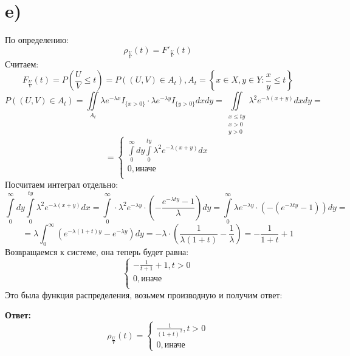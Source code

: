 \documentclass[a4paper,12pt]{article}
\begin{document}
\section*{e)}
По определению:
\[
\rho_{\frac{U}{V}}(t) = F'_{\frac{U}{V}}(t)
\]
Считаем:
\[
F_{\frac{U}{V}} (t) = P\left(\frac{U}{V} \leq t\right) = P((U, V) \in A_t), A_t = \left\{ x \in X, y \in Y : \frac{x}{y} \leq t \right\}
\]
\[
P((U, V) \in A_t) = \iint\limits_{A_t} \lambda e^{- \lambda x} I_{\{x > 0\}} \cdot \lambda e^{- \lambda y} I_{\{y > 0\}} dxdy = \iint\limits_{\begin{matrix}
x \leq ty \\
x > 0 \\
y > 0
\end{matrix}} \lambda^2 e^{-\lambda(x+y)} dx dy =
\]
\[
=
 \begin{cases}
\int\limits_0^{\infty} dy \int\limits_0^{ty} \lambda^2 e^{-\lambda (x + y)} dx \\
0, \text{иначе}  \\
\end{cases}
\]
Посчитаем интеграл отдельно:
\[
\int\limits_0^{\infty} dy \int\limits_0^{ty} \lambda^2 e^{-\lambda (x + y)} dx = \int\limits_0^{\infty}  \cdot \lambda^2 e^{-\lambda y} \cdot \left(-\frac{e^{-\lambda ty} - 1}{\lambda} \right) dy  = \int\limits_0^{\infty}  \lambda e^{-\lambda y} \cdot( -\left(e^{-\lambda ty} - 1 \right)) dy = \]
\[
=
\lambda \int_0^{\infty} \left( e^{-\lambda(1+t)y} - e^{-\lambda y} \right)dy = - \lambda \cdot \left(\frac{1}{\lambda(1+t)} - \frac{1}{\lambda} \right) =- \frac{1}{1+t} + 1
\] 
Возвращаемся к системе, она теперь будет равна:
\[
\begin{cases}
-\frac{1}{t+1} + 1, t > 0\\
0, \text{иначе} \\
\end{cases}
\]
Это была функция распределения, возьмем производную и получим ответ:
\begin{center}
\textbf{Ответ: } 
\[
\rho_{\frac{U}{V}}(t) = \begin{cases}
\frac{1}{(1+t)^2}, t > 0 \\
0, \text{иначе}
\end{cases}
\]
\end{center}
\end{document}
